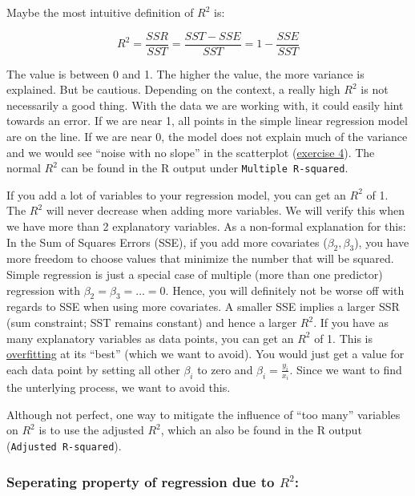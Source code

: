 \documentclass[
]{book}
\begin{document}
Maybe the most intuitive definition of \(R^2\) is:

\[ R^2 = \frac{SSR}{SST} = \frac{SST - SSE}{SST} = 1 - \frac{SSE}{SST}\]

The value is between 0 and 1. The higher the value, the more variance is explained.
But be cautious. Depending on the context, a really high \(R^2\) is not
necessarily a good thing. With the data we are working with,
it could easily hint towards an error. If we are near 1,
all points in the simple linear regression model are on the line.
If we are near 0, the model does not explain much of the variance
and we would see ``noise with no slope'' in the scatterplot (\hyperref[exercise4_simpl_lin_reg]{exercise 4}).
The normal \(R^2\) can be found in the R output under \texttt{Multiple\ R-squared}.

If you add a lot of variables to your regression model, you can get an
\(R^2\) of 1. The \(R^2\) will never decrease when adding more variables.
We will verify this when we have more than 2 explanatory variables.
As a non-formal explanation for this: In the Sum of Squares Errors (SSE),
if you add more covariates (\(\beta_2, \beta_3\)), you have more freedom
to choose values that minimize the number that will be squared. Simple regression
is just a special case of multiple (more than one predictor) regression with \(\beta_2=\beta_3=\dots=0\).
Hence, you will definitely not be worse off with regards to SSE when using more covariates.
A smaller SSE implies a larger SSR (sum constraint; SST remains constant) and hence a larger \(R^2\).
If you have as many explanatory variables as data points, you can get an \(R^2\) of 1. This is
\href{https://en.wikipedia.org/wiki/Overfitting}{overfitting} at its ``best'' (which we want to avoid).
You would just get a value for each data point by setting all other \(\beta_i\) to zero and
\(\beta_i = \frac{y_i}{x_i}\).
Since we want to find the unterlying process, we want to avoid this.

Although not perfect, one way to mitigate the influence of ``too many'' variables
on \(R^2\) is to use the adjusted \(R^2\), which an also be found in the R output (\texttt{Adjusted\ R-squared}).

\subsubsection{\texorpdfstring{Seperating property of regression due to \(R^2\):}{Seperating property of regression due to R\^{}2:}}\label{seperating_property}
\end{document}
